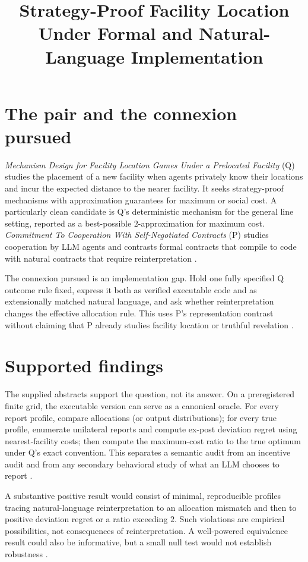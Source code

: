 \documentclass{article}
\title{Strategy-Proof Facility Location Under Formal and Natural-Language Implementation}
\begin{document}
\maketitle

\section{The pair and the connexion pursued}

\emph{Mechanism Design for Facility Location Games Under a Prelocated Facility} (Q) studies the placement of a new facility when agents privately know their locations and incur the expected distance to the nearer facility.  It seeks strategy-proof mechanisms with approximation guarantees for maximum or social cost.  A particularly clean candidate is Q's deterministic mechanism for the general line setting, reported as a best-possible \(2\)-approximation for maximum cost.  \emph{Commitment To Cooperation With Self-Negotiated Contracts} (P) studies cooperation by LLM agents and contrasts formal contracts that compile to code with natural contracts that require reinterpretation .

The connexion pursued is an implementation gap.  Hold one fully specified Q outcome rule fixed, express it both as verified executable code and as extensionally matched natural language, and ask whether reinterpretation changes the effective allocation rule.  This uses P's representation contrast without claiming that P already studies facility location or truthful revelation .

\section{Supported findings}

The supplied abstracts support the question, not its answer.  On a preregistered finite grid, the executable version can serve as a canonical oracle.  For every report profile, compare allocations (or output distributions); for every true profile, enumerate unilateral reports and compute ex-post deviation regret using nearest-facility costs; then compute the maximum-cost ratio to the true optimum under Q's exact convention.  This separates a semantic audit from an incentive audit and from any secondary behavioral study of what an LLM chooses to report .

A substantive positive result would consist of minimal, reproducible profiles tracing natural-language reinterpretation to an allocation mismatch and then to positive deviation regret or a ratio exceeding \(2\).  Such violations are empirical possibilities, not consequences of reinterpretation.  A well-powered equivalence result could also be informative, but a small null test would not establish robustness .
\end{document}
